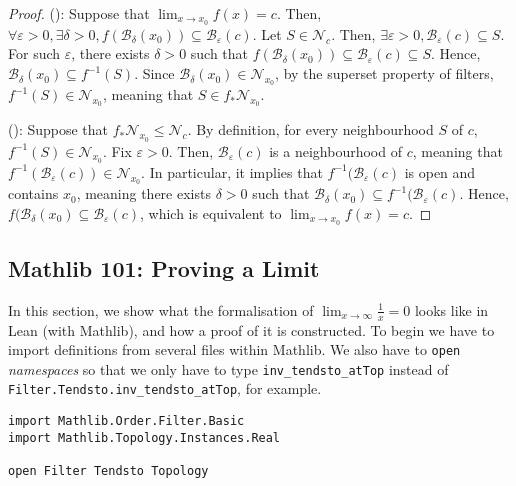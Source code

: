 \begin{proof}
  (\implies): Suppose that \(\lim_{x \to x_0} f(x) = c\). Then, \(\forall \varepsilon > 0, \exists \delta > 0, f(\mathcal{B}_{\delta}(x_0)) \subseteq \mathcal{B}_{\varepsilon}(c)\). Let \(S \in \mathcal{N}_c\). Then, \(\exists \varepsilon > 0, \mathcal{B}_{\varepsilon}(c) \subseteq S\). For such \(\varepsilon\), there exists \(\delta > 0\) such that \(f(\mathcal{B}_{\delta}(x_0)) \subseteq \mathcal{B}_{\varepsilon}(c) \subseteq S\). Hence, \(\mathcal{B}_{\delta}(x_0) \subseteq f^{-1}(S)\). Since \(\mathcal{B}_{\delta}(x_0) \in \mathcal{N}_{x_0}\), by the superset property of filters, \(f^{-1}(S) \in \mathcal{N}_{x_0}\), meaning that \(S \in f_*\mathcal{N}_{x_0}\).

  (\impliedby): Suppose that \(f_*\mathcal{N}_{x_0} \leq \mathcal{N}_c\). By definition, for every neighbourhood \(S\) of \(c\), \(f^{-1}(S) \in \mathcal{N}_{x_0}\). Fix \(\varepsilon > 0\). Then, \(\mathcal{B}_{\varepsilon}(c)\) is a neighbourhood of \(c\), meaning that \(f^{-1}(\mathcal{B}_{\varepsilon}(c)) \in \mathcal{N}_{x_0}\). In particular, it implies that \(f^{-1}(\mathcal{B}_{\varepsilon}(c)\) is open and contains \(x_0\), meaning there exists \(\delta > 0\) such that \(\mathcal{B}_{\delta}(x_0) \subseteq f^{-1}(\mathcal{B}_{\varepsilon}(c)\). Hence, \(f(\mathcal{B}_{\delta}(x_0) \subseteq \mathcal{B}_{\varepsilon}(c)\), which is equivalent to \(\lim_{x \to x_0} f(x) = c\).
\end{proof}

\subsection{Mathlib 101: Proving a Limit}

In this section, we show what the formalisation of \(\lim_{x \to \infty} \frac{1}{x} = 0\) looks like in Lean (with Mathlib), and how a proof of it is constructed. To begin we have to import definitions from several files within Mathlib. We also have to \texttt{open} \textit{namespaces} so that we only have to type \texttt{inv_tendsto_atTop} instead of \texttt{Filter.Tendsto.inv_tendsto_atTop}, for example.

\begin{verbatim}
import Mathlib.Order.Filter.Basic
import Mathlib.Topology.Instances.Real

open Filter Tendsto Topology
\end{verbatim}


